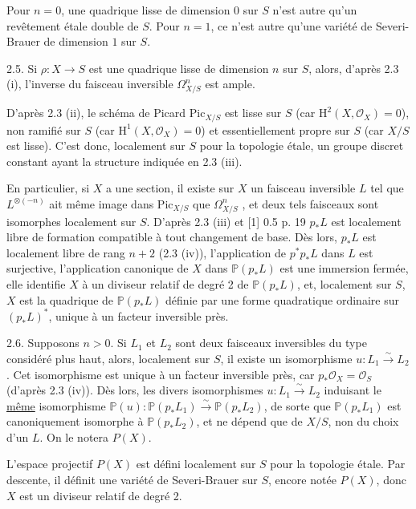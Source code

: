 Pour $n = 0$, une quadrique lisse de dimension $0$ sur $S$ n'est autre qu'un revêtement étale double de $S$. Pour $n = 1$, ce n'est autre qu'une variété de Severi-Brauer de dimension $1$ sur $S$.

2.5. Si $\rho : X \longrightarrow S$ est une quadrique lisse de dimension $n$ sur $S$, alors, d'après 2.3 (i), l'inverse du faisceau inversible $\Omega^n_{X/S}$ est ample.



D'après 2.3 (ii), le schéma de Picard $\mathrm{Pic}_{X/S}$ est lisse sur $S$ (car $\mathrm{H}^2(X,\mathcal{O}_X) = 0$), non ramifié sur $S$ (car $\mathrm{H}^1(X,\mathcal{O}_X) = 0$) et essentiellement propre sur $S$ (car $X/S$ est lisse). C'est donc, localement sur $S$ pour la topologie étale, un groupe discret constant ayant la structure indiquée en 2.3 (iii).

En particulier, si $X$ a une section, il existe sur $X$ un faisceau inversible $L$ tel que $L^{\otimes(-n)}$ ait même image dans $\mathrm{Pic}_{X/S}$ que $\Omega^n_{X/S}$ , et deux tels faisceaux sont isomorphes localement sur $S$. D'après 2.3 (iii) et [1] 0.5 p. 19 $p_*L$ est localement libre de formation compatible à tout changement de base. Dès lors, $p_*L$ est localement libre de rang $n + 2$ (2.3 (iv)), l'application de $p^*p_*L$ dans $L$ est surjective, l'application canonique de $X$ dans $\mathbb{P}(p_*L)$ est une immersion fermée, elle identifie $X$ à un diviseur relatif de degré 2 de $\mathbb{P}(p_*L)$, et, localement sur $S$, $X$ est la quadrique de $\mathbb{P}(p_*L)$ définie par une forme quadratique ordinaire sur $(p_*L)^*$, unique à un facteur inversible près.

2.6. Supposons $n > 0$. Si $L_1$ et $L_2$ sont deux faisceaux inversibles du type considéré plus haut, alors, localement sur $S$, il existe un isomorphisme $u : L_1 \stackrel{\sim}{\longrightarrow} L_2$. Cet isomorphisme est unique à un facteur inversible près, car $p_*\mathcal{O}_X = \mathcal{O}_S$ (d'après 2.3 (iv)). Dès lors, les divers isomorphismes $u : L_1 \stackrel{\sim}{\longrightarrow} L_2$ induisant le \underline{même} isomorphisme $\mathbb{P}(u): \mathbb{P}(p_*L_1) \stackrel{\sim}{\longrightarrow} \mathbb{P}(p_*L_2)$, de sorte que $\mathbb{P}(p_*L_1)$ est canoniquement isomorphe à $\mathbb{P}(p_*L_2)$, et ne dépend que de $X/S$, non du choix d'un $L$. On le notera $P(X)$.



L'espace projectif $P(X)$ est défini localement sur $S$ pour la topologie étale. Par descente, il définit une variété de Severi-Brauer sur $S$, encore notée $P(X)$, donc $X$ est un diviseur relatif de degré 2.

